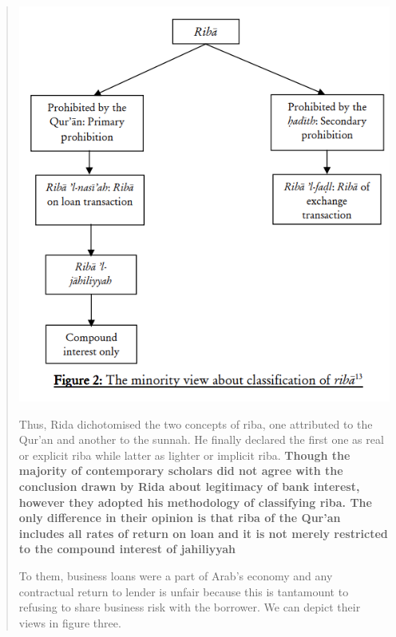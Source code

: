 \begin{quote}
\includegraphics[width=\textwidth]{CourantsIslamContemporain/ImagesCourantsIslamContemporain/RibaRida.png}

Thus, Rida dichotomised the two concepts of riba, one attributed to the Qur'an and another to the sunnah. He finally declared the first one as real or explicit riba while latter as lighter or implicit riba.
\textbf{
Though the majority of contemporary scholars did not agree with the conclusion drawn by Rida about legitimacy of bank interest, however they adopted his methodology of classifying riba. The only difference in their opinion is that riba of the Qur'an includes all rates of return on loan and it is not merely restricted to the compound interest of jahiliyyah}


To them, business loans were a part of Arab's economy and any contractual return to lender is unfair because this is tantamount to refusing to share business risk with the borrower. We can depict their views in figure three.



\end{quote}

